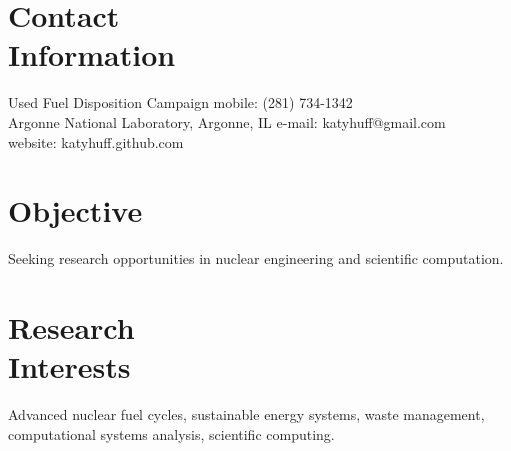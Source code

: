 \documentclass[margin,line]{resume}
\begin{document}
\begin{resume}

    \section{\mysidestyle Contact\\Information}

    Used Fuel Disposition Campaign                          \hfill mobile: (281) 734-1342           \vspace{0mm}\\\vspace{0mm}%
    Argonne National Laboratory, Argonne, IL                \hfill e-mail: katyhuff@gmail.com            \vspace{0mm}\\\vspace{0mm}%
                                                            \hfill website: katyhuff.github.com     \vspace{0mm}\\\vspace{-4.5mm}%

    \section{\mysidestyle Objective}
		Seeking research opportunities in nuclear engineering and scientific computation.%
    \section{\mysidestyle Research\\Interests}
		Advanced nuclear fuel cycles, sustainable energy systems, waste 
                management, computational systems analysis, scientific 
                computing.%

\end{resume}
\end{document}
